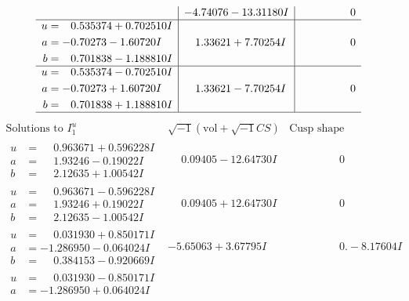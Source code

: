 \documentclass[1p]{elsarticle_modified}
\theoremstyle{definition}
\newcommand{\I}{\sqrt{-1}}
\begin{document}
$$\begin{array}{c|c|c}
 & -4.74076 - 13.31180 I & \phantom{-0.000000 } 0 \\ \hline\begin{aligned}
u &= \phantom{-}0.535374 + 0.702510 I \\
a &= -0.70273 - 1.60720 I \\
b &= \phantom{-}0.701838 - 1.188810 I\end{aligned}
 & \phantom{-}1.33621 + 7.70254 I & \phantom{-0.000000 } 0 \\ \hline\begin{aligned}
u &= \phantom{-}0.535374 - 0.702510 I \\
a &= -0.70273 + 1.60720 I \\
b &= \phantom{-}0.701838 + 1.188810 I\end{aligned}
 & \phantom{-}1.33621 - 7.70254 I & \phantom{-0.000000 } 0\\
 \hline 
 \end{array}$$\newpage$$\begin{array}{c|c|c}  
\text{Solutions to }I^u_{1}& \I (\text{vol} + \sqrt{-1}CS) & \text{Cusp shape}\\
 \hline 
\begin{aligned}
u &= \phantom{-}0.963671 + 0.596228 I \\
a &= \phantom{-}1.93246 - 0.19022 I \\
b &= \phantom{-}2.12635 + 1.00542 I\end{aligned}
 & \phantom{-}0.09405 - 12.64730 I & \phantom{-0.000000 } 0 \\ \hline\begin{aligned}
u &= \phantom{-}0.963671 - 0.596228 I \\
a &= \phantom{-}1.93246 + 0.19022 I \\
b &= \phantom{-}2.12635 - 1.00542 I\end{aligned}
 & \phantom{-}0.09405 + 12.64730 I & \phantom{-0.000000 } 0 \\ \hline\begin{aligned}
u &= \phantom{-}0.031930 + 0.850171 I \\
a &= -1.286950 - 0.064024 I \\
b &= \phantom{-}0.384153 - 0.920669 I\end{aligned}
 & -5.65063 + 3.67795 I & \phantom{-0.000000 } 0. - 8.17604 I \\ \hline\begin{aligned}
u &= \phantom{-}0.031930 - 0.850171 I \\
a &= -1.286950 + 0.064024 I \\

\end{aligned}
\end{array}$$
\end{document}

